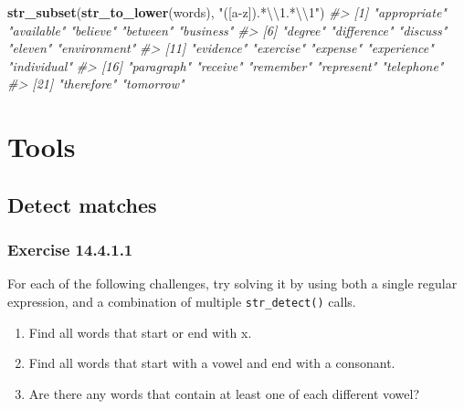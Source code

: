 \documentclass[]{book}
\newenvironment{Shaded}{\begin{snugshade}}{\end{snugshade}}
\newcommand{\CharTok}[1]{\textcolor[rgb]{0.31,0.60,0.02}{#1}}
\newcommand{\CommentTok}[1]{\textcolor[rgb]{0.56,0.35,0.01}{\textit{#1}}}
\newcommand{\KeywordTok}[1]{\textcolor[rgb]{0.13,0.29,0.53}{\textbf{#1}}}
\newcommand{\NormalTok}[1]{#1}
\newcommand{\StringTok}[1]{\textcolor[rgb]{0.31,0.60,0.02}{#1}}
\providecommand{\tightlist}{%
  \setlength{\itemsep}{0pt}\setlength{\parskip}{0pt}}
\theoremstyle{plain}
\theoremstyle{remark}
\begin{document}
\begin{enumerate}
\begin{Shaded}
\begin{Highlighting}[]
\KeywordTok{str_subset}\NormalTok{(}\KeywordTok{str_to_lower}\NormalTok{(words), }\StringTok{"([a-z]).*}\CharTok{\textbackslash{}\textbackslash{}}\StringTok{1.*}\CharTok{\textbackslash{}\textbackslash{}}\StringTok{1"}\NormalTok{)}
\CommentTok{#>  [1] "appropriate" "available"   "believe"     "between"     "business"   }
\CommentTok{#>  [6] "degree"      "difference"  "discuss"     "eleven"      "environment"}
\CommentTok{#> [11] "evidence"    "exercise"    "expense"     "experience"  "individual" }
\CommentTok{#> [16] "paragraph"   "receive"     "remember"    "represent"   "telephone"  }
\CommentTok{#> [21] "therefore"   "tomorrow"}
\end{Highlighting}
\end{Shaded}
\end{enumerate}

\hypertarget{tools}{%
\section{Tools}\label{tools}}

\hypertarget{detect-matches}{%
\subsection{Detect matches}\label{detect-matches}}

\hypertarget{exercise-14.4.1.1}{%
\subsubsection*{\texorpdfstring{Exercise {14.4.1.1}}{Exercise 14.4.1.1}}\label{exercise-14.4.1.1}}

For each of the following challenges, try solving it by using both a single regular expression, and a combination of multiple \texttt{str\_detect()} calls.

\begin{enumerate}
\def\labelenumi{\arabic{enumi}.}
\tightlist
\item
  Find all words that start or end with x.
\item
  Find all words that start with a vowel and end with a consonant.
\item
  Are there any words that contain at least one of each different vowel?
\end{enumerate}
\end{document}
